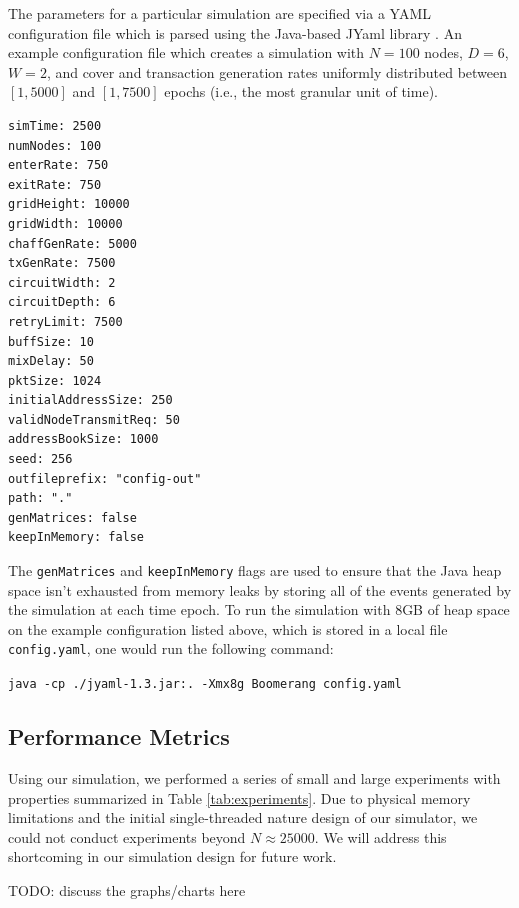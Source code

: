 The parameters for a particular simulation are specified via a YAML configuration file which is parsed using the Java-based JYaml library \cite{jyaml}. An example configuration file which creates a simulation with $N = 100$ nodes, $D = 6$, $W = 2$, and cover and transaction generation rates uniformly distributed between $[1, 5000]$ and $[1, 7500]$ epochs (i.e., the most granular unit of time).

\begin{lstlisting}
simTime: 2500
numNodes: 100
enterRate: 750
exitRate: 750
gridHeight: 10000
gridWidth: 10000
chaffGenRate: 5000
txGenRate: 7500
circuitWidth: 2
circuitDepth: 6
retryLimit: 7500
buffSize: 10
mixDelay: 50
pktSize: 1024
initialAddressSize: 250
validNodeTransmitReq: 50
addressBookSize: 1000
seed: 256
outfileprefix: "config-out"
path: "."
genMatrices: false
keepInMemory: false
\end{lstlisting}

The {\tt genMatrices} and {\tt keepInMemory} flags are used to ensure that the Java heap space isn't exhausted from memory leaks by storing all of the events generated by the simulation at each time epoch. To run the simulation with 8GB of heap space on the example configuration listed above, which is stored in a local file {\tt config.yaml}, one would run the following command:

\begin{center}
{\small \tt java -cp ./jyaml-1.3.jar:. -Xmx8g Boomerang config.yaml}
\end{center}

\subsection{Performance Metrics}
Using our simulation, we performed a series of small and large experiments with properties summarized in Table \ref{tab:experiments}. Due to physical memory limitations and the initial single-threaded nature design of our simulator, we could not conduct experiments beyond $N \approx 25000$. We will address this shortcoming in our simulation design for future work.

TODO: discuss the graphs/charts here

